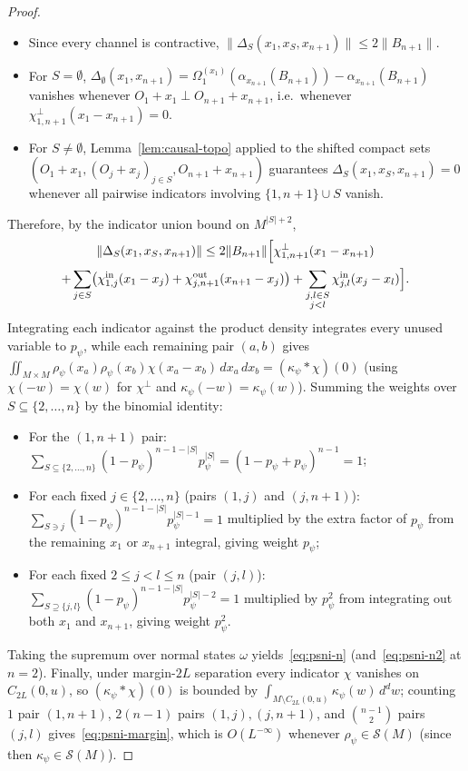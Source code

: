 \documentclass[11pt,a4paper]{article}
\theoremstyle{definition}
\theoremstyle{remark}
\newcommand{\norm}[1]{\|#1\|}
\begin{document}
\begin{proof}
\begin{itemize}[leftmargin=*,nosep]
\item Since every channel is contractive, $\norm{\Delta_S(x_1,x_S,x_{n+1})}\le 2\norm{B_{n+1}}$.
\item For $S=\emptyset$, $\Delta_\emptyset(x_1,x_{n+1}) = \Omega_1^{(x_1)}(\alpha_{x_{n+1}}(B_{n+1})) - \alpha_{x_{n+1}}(B_{n+1})$ vanishes whenever $O_1+x_1\perp O_{n+1}+x_{n+1}$, i.e.\ whenever $\chi^\perp_{1,n+1}(x_1-x_{n+1}) = 0$.
\item For $S\neq\emptyset$, Lemma~\ref{lem:causal-topo} applied to the shifted compact sets $(O_1+x_1, (O_j+x_j)_{j\in S}, O_{n+1}+x_{n+1})$ guarantees $\Delta_S(x_1,x_S,x_{n+1}) = 0$ whenever all pairwise indicators involving $\{1, n+1\}\cup S$ vanish.
\end{itemize}
Therefore, by the indicator union bound on $M^{|S|+2}$,
\begin{multline*}
\norm{\Delta_S(x_1, x_S, x_{n+1})} \le 2\norm{B_{n+1}}\Bigl[\chi^\perp_{1,n+1}(x_1-x_{n+1}) \\
+ \sum_{j\in S}\bigl(\chi^{\mathrm{in}}_{1,j}(x_1-x_j) + \chi^{\mathrm{out}}_{j,n+1}(x_{n+1}-x_j)\bigr)
+ \sum_{\substack{j,l\in S\\ j<l}}\chi^{\mathrm{in}}_{j,l}(x_j-x_l)\Bigr].
\end{multline*}
Integrating each indicator against the product density integrates every unused variable to $p_\psi$, while each remaining pair $(a,b)$ gives $\iint_{M\times M}\rho_\psi(x_a)\rho_\psi(x_b)\chi(x_a-x_b)\,dx_a\,dx_b = (\kappa_\psi*\chi)(0)$ (using $\chi(-w)=\chi(w)$ for $\chi^\perp$ and $\kappa_\psi(-w)=\kappa_\psi(w)$). Summing the weights over $S\subseteq\{2,\dots,n\}$ by the binomial identity:
\begin{itemize}[leftmargin=*,nosep]
\item For the $(1,n+1)$ pair: $\sum_{S\subseteq\{2,\dots,n\}} (1-p_\psi)^{n-1-|S|} p_\psi^{|S|} = (1-p_\psi+p_\psi)^{n-1} = 1$;
\item For each fixed $j\in\{2,\dots,n\}$ (pairs $(1,j)$ and $(j,n+1)$): $\sum_{S\ni j} (1-p_\psi)^{n-1-|S|} p_\psi^{|S|-1} = 1$ multiplied by the extra factor of $p_\psi$ from the remaining $x_1$ or $x_{n+1}$ integral, giving weight $p_\psi$;
\item For each fixed $2\le j < l \le n$ (pair $(j,l)$): $\sum_{S\supseteq\{j,l\}} (1-p_\psi)^{n-1-|S|} p_\psi^{|S|-2} = 1$ multiplied by $p_\psi^2$ from integrating out both $x_1$ and $x_{n+1}$, giving weight $p_\psi^2$.
\end{itemize}
Taking the supremum over normal states $\omega$ yields~\eqref{eq:psni-n} (and~\eqref{eq:psni-n2} at $n=2$). Finally, under margin-$2L$ separation every indicator $\chi$ vanishes on $C_{2L}(0,u)$, so $(\kappa_\psi*\chi)(0)$ is bounded by $\int_{M\setminus C_{2L}(0,u)}\kappa_\psi(w)\,d^dw$; counting $1$ pair $(1,n+1)$, $2(n-1)$ pairs $(1,j),(j,n+1)$, and $\binom{n-1}{2}$ pairs $(j,l)$ gives~\eqref{eq:psni-margin}, which is $O(L^{-\infty})$ whenever $\rho_\psi\in\mathcal{S}(M)$ (since then $\kappa_\psi\in\mathcal{S}(M)$).
\end{proof}
\end{document}
